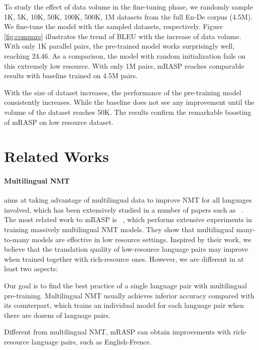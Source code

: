 \documentclass[11pt,a4paper]{article}
\newcommand{\method}{mRASP\xspace}
\begin{document}
To study the effect of data volume in the fine-tuning phase, we randomly sample 1K, 5K, 10K, 50K, 100K, 500K, 1M datasets from the full En-De corpus (4.5M). We fine-tune the model with the sampled datasets, respectively. Figure \ref{fig:compare} illustrates the trend of BLEU with the increase of data volume. With only 1K parallel pairs, the pre-trained model works surprisingly well, reaching 24.46. As a comparison, the model with random initialization fails on this extremely low resource. 
With only 1M pairs, \method reaches comparable results with baseline trained on 4.5M pairs.

With the size of dataset increases, the performance of the pre-training model consistently increases. 
While the baseline does not see any improvement until the volume of the dataset reaches 50K. The results confirm the remarkable boosting of \method on low resource dataset.







 
\section{Related Works}
\label{sec:related}

\paragraph{ Multilingual NMT}  aims at taking advantage of multilingual data to improve NMT for all languages involved, which has been extensively studied in a number of papers such as ~\citet{dong2015multi,DBLP:journals/tacl/JohnsonSLKWCTVW17,lu2018neural,rahimi2019massively,tan2019multilingual}. 
The most related work to \method is ~\citet{rahimi2019massively}, which performs extensive experiments in
training massively multilingual NMT models.  
They show that multilingual many-to-many models are effective in low resource settings.
Inspired by their work, we believe that the translation quality of  low-resource language pairs may improve when trained together with rich-resource ones.
However, we are different in at least two aspects: \begin{inparaenum}[\it a)]
    \item Our goal is to find the best practice of a single language pair with multilingual pre-training. Multilingual NMT usually achieves inferior accuracy compared with its counterpart, which trains an individual model for each language pair when there are dozens of language pairs.
    \item Different from multilingual NMT, \method can obtain improvements with rich-resource language pairs, such as English-Frence.
\end{inparaenum}
\end{document}
